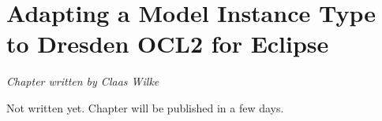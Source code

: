 \chapter{Adapting a Model Instance Type to Dresden OCL2 for Eclipse}
\label{chapter:modelInstanceTypeAdaptation}

\begin{flushright}
\textit{Chapter written by Claas Wilke}
\end{flushright}

Not written yet. Chapter will be published in a few days.

